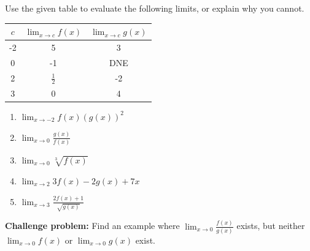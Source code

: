 \documentclass{ximera}
\begin{document}
\begin{exercise}
    Use the given table to evaluate the following limits, or explain why you cannot. \\
  \begin{center}
        \begin{tabular}{c|c|c}
            $c$ & $\lim_{x\rightarrow c}f(x)$ & $\lim_{x\rightarrow c}g(x)$  \\ \hline
            -2 &  5 & 3\\ 
            0 & -1 & DNE\\ 
            2 & $\displaystyle\frac{1}{2}$ & -2\\
            3 & 0 & 4
        \end{tabular}
     \end{center}
     \begin{enumerate}
     \item $\displaystyle\lim_{x\rightarrow -2} f(x)(g(x))^2$
     \item $\displaystyle\lim_{x\rightarrow 0} \frac{g(x)}{f(x)}$
     \item $\displaystyle \lim_{x\rightarrow 0} \sqrt[3]{f(x)}$
     \item $\displaystyle \lim_{x\rightarrow 2} 3f(x)-2g(x)+7x$ 
     \item $\displaystyle \lim_{x\rightarrow 3} \frac{2f(x)+1}{\sqrt{g(x)}}$ 
    \end{enumerate}
\end{exercise}

\begin{exercise}
     \textbf{Challenge problem: }Find an example where $\displaystyle \lim_{x\rightarrow 0} \frac{f(x)}{g(x)}$ exists, but neither $\displaystyle\lim_{x\rightarrow 0}f(x)$ or $\displaystyle \lim_{x\rightarrow 0}g(x)$ exist.\\
\end{exercise}
\end{document}
